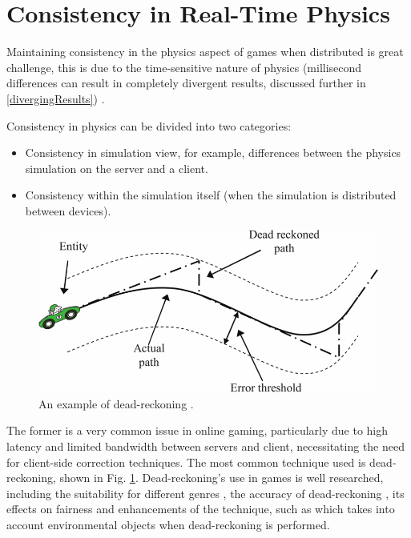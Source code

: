 \section{Consistency in Real-Time Physics}


Maintaining consistency in the physics aspect of games when distributed is great challenge, this is due to the time-sensitive nature of physics (millisecond differences can result in completely divergent results, discussed further in \ref{divergingResults}) \cite{2012EnhancedDeadReckoning}.

Consistency in physics can be divided into two categories:
\begin{itemize}
\item Consistency in simulation view, for example, differences between the physics simulation on the server and a client.
\item Consistency within the simulation itself (when the simulation is distributed between devices).
\end{itemize}

\begin{figure}
	\centering
	\includegraphics[width=\textwidth]{Figs/DeadReckoning}
	\caption{An example of dead-reckoning \cite{2012EnhancedDeadReckoning}.}
	\label{fig_DeadReckoning}
\end{figure}

The former is a very common issue in online gaming, particularly due to high latency and limited bandwidth between servers and client, necessitating the need for client-side correction techniques. The most common technique used is dead-reckoning, shown in Fig. \ref{fig_DeadReckoning}. Dead-reckoning's use in games is well researched, including the suitability for different genres \cite{2002DeadReckoningSuitability}, the accuracy of dead-reckoning \cite{2004AccuracyDeadReckoning}, its effects on fairness \cite{2005FairnessDeadReckoning} and enhancements of the technique, such as \cite{2012EnhancedDeadReckoning} which takes into account environmental objects when dead-reckoning is performed.

